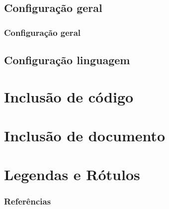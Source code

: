 \documentclass[brazilian]{beamer}
\begin{document}
\subsection{Configuração geral}
\begin{frame}[fragile]
    \frametitle{Configuração geral}

    

\end{frame}
\subsection{Configuração linguagem}

\section{Inclusão de código}

\section{Inclusão de documento}

\section{Legendas e Rótulos}

\begin{frame}[allowframebreaks]
    \frametitle{Referências}

    \nocite{*}
    \printbibliography[keyword={inserirCodigos}]

\end{frame}
\end{document}
